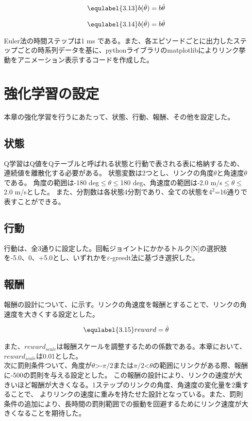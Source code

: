 \begin{eqnarray}
  \equlabel{3.13}
  b(\dot{\theta}) = b\dot{\theta}
\end{eqnarray}

\begin{eqnarray}
  \equlabel{3.14}
  b(\dot{\theta}) = b\dot{\theta}
\end{eqnarray}

Euler法の時間ステップは1 ms である。また、各エピソードごとに出力したステップごとの時系列データを基に、pythonライブラリのmatplotlibによりリンク挙動をアニメーション表示するコードを作成した。
\section{強化学習の設定}
本章の強化学習を行うにあたって、状態、行動、報酬、その他を設定した。
\subsection{状態}
Q学習はQ値をQテーブルと呼ばれる状態と行動で表される表に格納するため、連続値を離散化する必要がある。
状態変数は2つとし、リンクの角度$\theta$と角速度$\dot{\theta}$である。
角度の範囲は-180 deg$\leq$$\theta$$\leq$180 deg、角速度の範囲は-2.0 m/s$\leq$$\dot{\theta}$$\leq$2.0 m/sとした。
また、分割数は各状態4分割であり、全ての状態を$4^{2}$=16通りで表すことができる。
\subsection{行動}
行動は、全3通りに設定した。回転ジョイントにかかるトルク[N]の選択肢を-5.0、0、+5.0とし、いずれかを$\varepsilon$-greedt法に基づき選択した。
\subsection{報酬}
報酬の設計について、に示す。リンクの角速度を報酬とすることで、リンクの角速度を大きくする設定とした。

\begin{eqnarray}
  \equlabel{3.15}
  reward = \dot{\theta}
\end{eqnarray}

また、$reward_{scale}$は報酬スケールを調整するための係数である。本章において、$reward_{scale}$は0.01とした。\\
次に罰則条件ついて、角度が$\theta$>-$\pi/2$または$\pi/2$<$\theta$の範囲にリンクがある際、報酬に-500の罰則を与える設定とした。
この報酬の設計により、リンクの速度が大きいほど報酬が大きくなる。1ステップのリンクの角度、角速度の変化量を2乗することで、
よりリンクの速度に重みを持たせた設計となっている。また、罰則条件の追加により、長時間の罰則範囲での振動を回避するためにリンク速度が大きくなることを期待した。
